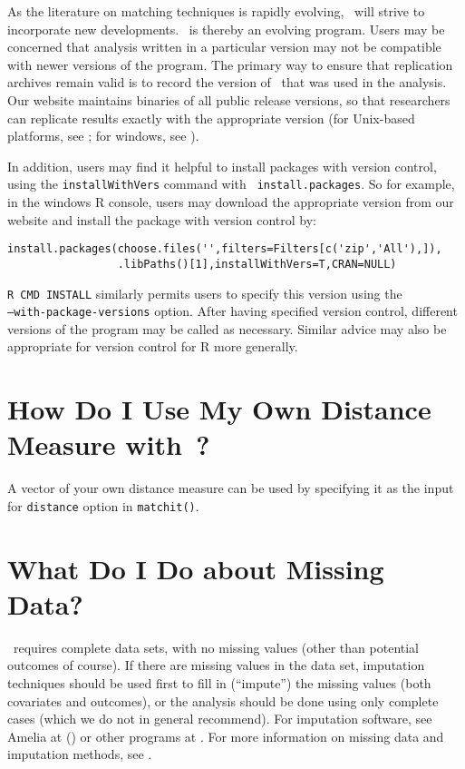 As the literature on matching techniques is rapidly evolving,
\MatchIt\ will strive to incorporate new developments. \MatchIt\ is
thereby an evolving program.  Users may be concerned that analysis
written in a particular version may not be compatible with newer
versions of the program.  The primary way to ensure that replication
archives remain valid is to record the version of \MatchIt\ that was
used in the analysis.  Our website maintains binaries of all public
release versions, so that researchers can replicate results exactly
with the appropriate version (for Unix-based platforms, see
;
for windows, see
).

In addition, users may find it helpful to install packages with
version control, using the {\tt installWithVers} command with {\tt
install.packages}.  So for example, in the windows R console, users
may download the appropriate version from our website and install the
package with version control by:

\begin{verbatim}
install.packages(choose.files('',filters=Filters[c('zip','All'),]),
                 .libPaths()[1],installWithVers=T,CRAN=NULL)
\end{verbatim}

{\tt R CMD INSTALL} similarly permits users to specify this version
using the \\ {\tt --with-package-versions} option.  After having
specified version control, different versions of the program may be
called as necessary.  Similar advice may also be appropriate for
version control for R more generally.

\section{How Do I Use My Own Distance Measure with \MatchIt\,?}

A vector of your own distance measure can be used by specifying it as
the input for {\tt distance} option in {\tt matchit()}.

\section{What Do I Do about Missing Data?}

\MatchIt\ requires complete data sets, with no missing values (other
than potential outcomes of course).  If there are missing values in
the data set, imputation techniques should be used first to fill in
(``impute'') the missing values (both covariates and outcomes), or the
analysis should be done using only complete cases (which we do not in
general recommend).  For imputation software, see Amelia at
()
or other programs at
.
For more information on missing data and imputation methods, see
\cite{KinHonJos01}.

